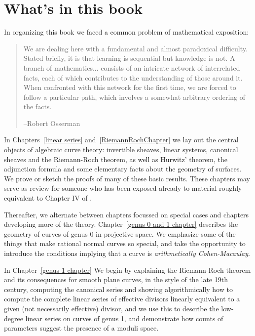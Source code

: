 

\section{What's in this book}
In organizing this book we faced a common problem of  mathematical exposition:
\begin{quote}
\small\sf
We are dealing here with a fundamental and almost paradoxical difficulty. Stated briefly, it is that learning is sequential but knowledge is not. A branch of mathematics... consists of an intricate network of interrelated facts, each of which contributes to the understanding of those around it. When confronted with this network for the first time, we are forced to follow a particular path, which involves a somewhat arbitrary ordering of the facts.

--Robert Osserman\cite{Poetry}

\end{quote}

In Chapters~\ref{linear series} and~\ref{RiemannRochChapter} we lay out the central objects of algebraic curve theory: invertible sheaves, linear systems, canonical sheaves and the Riemann-Roch theorem, as well as
Hurwitz' theorem,
the adjunction formula and  some elementary facts about the geometry of surfaces. We prove or sketch the
proofs of many of these basic results. These chapters may serve as review for someone who has been exposed already to material roughly equivalent to Chapter IV of \cite{Hartshorne1977}. 

Thereafter, we alternate between chapters focussed on special cases and chapters developing more of the theory. Chapter~\ref{genus 0 and 1 chapter}  describes the geometry of curves of genus 0  in projective space. We emphasize some of the things that make rational normal curves so special, and take the opportunity to introduce the conditions implying that a curve is \emph{arithmetically Cohen-Macaulay}. 

In Chapter~\ref{genus 1 chapter} We begin by explaining the Riemann-Roch theorem and its consequences for smooth plane curves,  in the style of the late 19th century, computing the canonical series and showing algorithmically how to compute the complete linear series of effective divisors linearly equivalent to a given (not necessarily effective) divisor, and we use this 
to describe the low-degree linear series on curves of genus 1, and demonstrate how counts of parameters suggest the presence of a moduli space.

